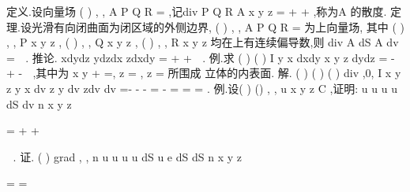 \textcolor{lyred}{定义}.设向量场
(
)
,
,
A
P Q R
=
\rho 
,记div
P
Q
R
A
x
y
z
\partial 
\partial 
\partial 
=
+
+
\partial 
\partial 
\partial 
\rho 
,称为A
\rho 
的\textcolor{lyred}{散度}.\textcolor{lyred}{ }
\textcolor{lyred}{定理}.设光滑有向闭曲面\Sigma 为闭区域\Omega 的外侧边界,
(
)
,
,
A
P Q R
=
\rho 
为\Omega 上向量场, 
其中
(
)
, ,
P x y z ,
(
)
, ,
Q x y z ,
(
)
, ,
R x y z 均在\Omega 上有连续偏导数,则 
div
A dS
A dv
\Sigma 
\Omega 
\cdots 
=
\cdots 
\int \int 
\int \int \int 
\rho 
\rho 
\rho 

. 
\textcolor{lyred}{推论}.
xdydz
ydzdx
zdxdy
\partial \Omega 
\Omega =
+
+
\int \int 
. 
\textcolor{lyred}{例}.求
(
)
(
)
I
y
x dxdy
x y
z dydz
\Sigma 
=
-
+
-
\int \int 
,其中\Sigma 为
x
y
+
=,
z =
,
z =
所围成 
立体的内表面. 
解.
(
)
(
)
(
)
div
,0,
I
x y
z
y
x dv
z
y dv
zdv
dv
\pi 
\Omega 
\Omega 
\Omega 
\Omega 
=-
-
-
=
-
=
=
=
\int \int \int 
\int \int \int 
\int \int \int 
\int \int \int 
. 
\textcolor{lyred}{例}.设(
)
()
, ,
u x y z
C
\in 
\Omega ,证明:
u
u
u
u
dS
dv
n
x
y
z
\partial \Omega 
\Omega 


\partial 
\partial 
\partial 
\partial 
=
+
+


\partial 
\partial 
\partial 
\partial 


\int \int 
\int \int \int 

. 
证.
(
)
grad
,
,
n
u
u
u
u
dS
u e
dS
dS
n
x
y
z
\partial \Omega 
\partial \Omega 
\partial \Omega 


\partial 
\partial 
\partial 
\partial 
=
\cdots 
=
\cdots 


\partial 
\partial 
\partial 
\partial 


